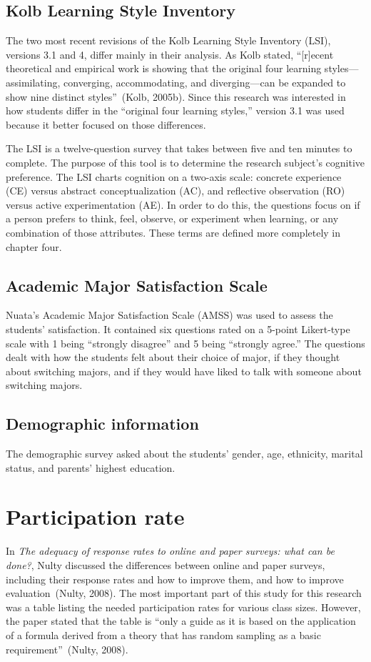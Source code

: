 \subsection{Kolb Learning Style Inventory}
The two most recent revisions of the Kolb Learning Style Inventory (LSI), versions 3.1 and 4, differ mainly in their analysis. As Kolb stated, ``[r]ecent theoretical and empirical work is showing that the original four learning styles—assimilating, converging, accommodating, and diverging—can be expanded to show nine distinct styles''~(Kolb, 2005b). Since this research was interested in how students differ in the ``original four learning styles,'' version 3.1 was used because it better focused on those differences.

The LSI is a twelve-question survey that takes between five and ten minutes to complete. The purpose of this tool is to determine the research subject's cognitive preference. The LSI charts cognition on a two-axis scale: concrete experience (CE) versus abstract conceptualization (AC), and reflective observation (RO) versus active experimentation (AE). In order to do this, the questions focus on if a person prefers to think, feel, observe, or experiment when learning, or any combination of those attributes. These terms are defined more completely in chapter four.

\subsection{Academic Major Satisfaction Scale}
Nuata's Academic Major Satisfaction Scale (AMSS) was used to assess the students' satisfaction. It contained six questions rated on a 5-point Likert-type scale with 1 being ``strongly disagree'' and 5 being ``strongly agree.'' The questions dealt with how the students felt about their choice of major, if they thought about switching majors, and if they would have liked to talk with someone about switching majors.

\subsection{Demographic information}
The demographic survey asked about the students' gender, age, ethnicity, marital status, and parents' highest education.

\section{Participation rate}
In \textit{The adequacy of response rates to online and paper surveys: what can be done?}, Nulty discussed the differences between online and paper surveys, including their response rates and how to improve them, and how to improve evaluation~(Nulty, 2008). The most important part of this study for this research was a table listing the needed participation rates for various class sizes. However, the paper stated that the table is ``only a guide as it is based on the application of a formula derived from a theory that has random sampling as a basic requirement''~(Nulty, 2008).

